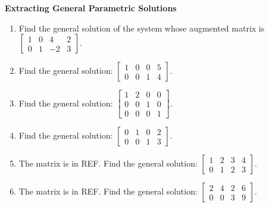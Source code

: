 \documentclass[11pt]{article}
\begin{document}
\textbf{Extracting General Parametric Solutions}
\begin{enumerate}[label=\textbf{1.2.\arabic*}, resume]
    \item Find the general solution of the system whose augmented matrix is $\left[\begin{array}{ccc|c} 1 & 0 & 4 & 2 \\ 0 & 1 & -2 & 3 \end{array}\right]$.
    \item Find the general solution: $\left[\begin{array}{ccc|c} 1 & 0 & 0 & 5 \\ 0 & 0 & 1 & 4 \end{array}\right]$.
    \item Find the general solution: $\left[\begin{array}{ccc|c} 1 & 2 & 0 & 0 \\ 0 & 0 & 1 & 0 \\ 0 & 0 & 0 & 1 \end{array}\right]$.
    \item Find the general solution: $\left[\begin{array}{ccc|c} 0 & 1 & 0 & 2 \\ 0 & 0 & 1 & 3 \end{array}\right]$.
    \item The matrix is in REF. Find the general solution: $\left[\begin{array}{ccc|c} 1 & 2 & 3 & 4 \\ 0 & 1 & 2 & 3 \end{array}\right]$.
    \item The matrix is in REF. Find the general solution: $\left[\begin{array}{ccc|c} 2 & 4 & 2 & 6 \\ 0 & 0 & 3 & 9 \end{array}\right]$.
\end{enumerate}
\end{document}

